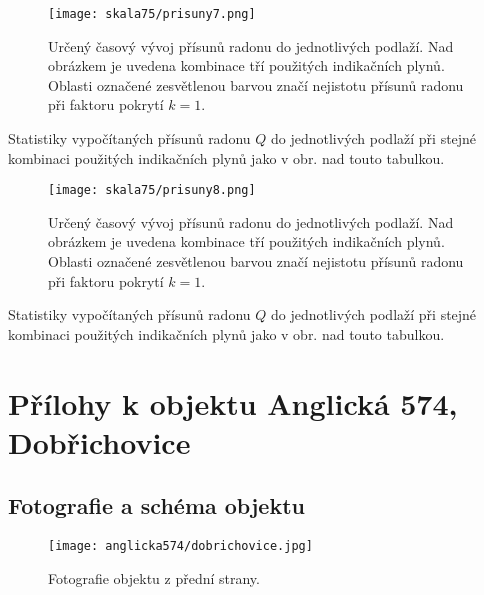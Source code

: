 \begin{figure}[H]
    \centering
    \texttt{[image: skala75/prisuny7.png]}
    \caption{Určený časový vývoj přísunů radonu do jednotlivých podlaží. Nad obrázkem je uvedena kombinace tří použitých indikačních plynů. Oblasti označené zesvětlenou barvou značí nejistotu přísunů radonu při faktoru pokrytí $k=1$.}
    \label{fig:skala75_prisuny7}
\end{figure}
\begin{table}[H]
    \centering
    \caption{Statistiky vypočítaných přísunů radonu $Q$ do jednotlivých podlaží při stejné kombinaci použitých indikačních plynů jako v obr. nad touto tabulkou.}
    \label{tab:skala75_prisuny7}
    
\end{table}

\begin{figure}[H]
    \centering
    \texttt{[image: skala75/prisuny8.png]}
    \caption{Určený časový vývoj přísunů radonu do jednotlivých podlaží. Nad obrázkem je uvedena kombinace tří použitých indikačních plynů. Oblasti označené zesvětlenou barvou značí nejistotu přísunů radonu při faktoru pokrytí $k=1$.}
    \label{fig:skala75_prisuny8}
\end{figure}
\begin{table}[H]
    \centering
    \caption{Statistiky vypočítaných přísunů radonu $Q$ do jednotlivých podlaží při stejné kombinaci použitých indikačních plynů jako v obr. nad touto tabulkou.}
    \label{tab:skala75_prisuny8}
    
\end{table}

\chapter{Přílohy k objektu Anglická 574, Dobřichovice}\label{navesti:priloha_anglicka574}

\section{Fotografie a schéma objektu}
\begin{figure}[ht]
    \centering
    \texttt{[image: anglicka574/dobrichovice.jpg]}
    \caption{Fotografie objektu z přední strany.}
    \label{fig:anglicka574_fotografie}
\end{figure}
